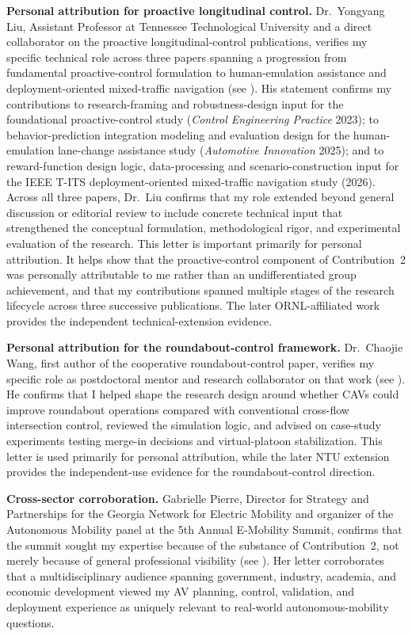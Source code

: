 \documentclass[11pt,letterpaper]{article}
\begin{document}
\textbf{Personal attribution for proactive longitudinal control.} Dr.~Yongyang Liu, Assistant Professor at Tennessee Technological University and a direct collaborator on the proactive longitudinal-control publications, verifies my specific technical role across three papers spanning a progression from fundamental proactive-control formulation to human-emulation assistance and deployment-oriented mixed-traffic navigation (see ). His statement confirms my contributions to research-framing and robustness-design input for the foundational proactive-control study (\textit{Control Engineering Practice} 2023); to behavior-prediction integration modeling and evaluation design for the human-emulation lane-change assistance study (\textit{Automotive Innovation} 2025); and to reward-function design logic, data-processing and scenario-construction input for the IEEE T-ITS deployment-oriented mixed-traffic navigation study (2026). Across all three papers, Dr.~Liu confirms that my role extended beyond general discussion or editorial review to include concrete technical input that strengthened the conceptual formulation, methodological rigor, and experimental evaluation of the research. This letter is important primarily for personal attribution. It helps show that the proactive-control component of Contribution~2 was personally attributable to me rather than an undifferentiated group achievement, and that my contributions spanned multiple stages of the research lifecycle across three successive publications. The later ORNL-affiliated work provides the independent technical-extension evidence.

\textbf{Personal attribution for the roundabout-control framework.} Dr.~Chaojie Wang, first author of the cooperative roundabout-control paper, verifies my specific role as postdoctoral mentor and research collaborator on that work (see ). He confirms that I helped shape the research design around whether CAVs could improve roundabout operations compared with conventional cross-flow intersection control, reviewed the simulation logic, and advised on case-study experiments testing merge-in decisions and virtual-platoon stabilization. This letter is used primarily for personal attribution, while the later NTU extension provides the independent-use evidence for the roundabout-control direction.

\textbf{Cross-sector corroboration.} Gabrielle Pierre, Director for Strategy and Partnerships for the Georgia Network for Electric Mobility and organizer of the Autonomous Mobility panel at the 5th Annual E-Mobility Summit, confirms that the summit sought my expertise because of the substance of Contribution~2, not merely because of general professional visibility (see ). Her letter corroborates that a multidisciplinary audience spanning government, industry, academia, and economic development viewed my AV planning, control, validation, and deployment experience as uniquely relevant to real-world autonomous-mobility questions.
\end{document}
